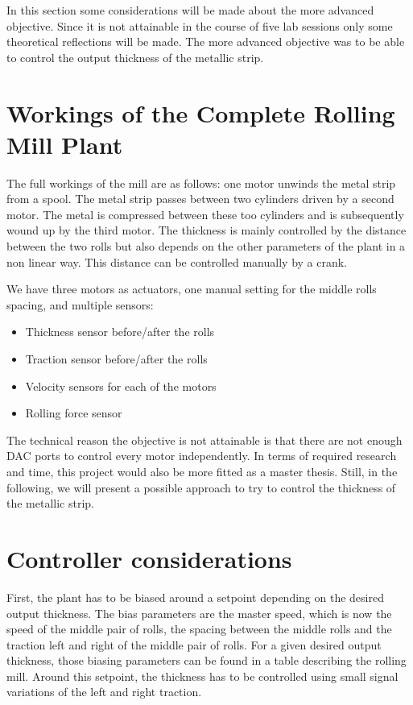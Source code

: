 In this section some considerations will be made about the more advanced objective. Since it is not attainable in the course of five lab sessions only some theoretical reflections will be made. The more advanced objective was to be able to control the output thickness of the metallic strip.

\section{Workings of the Complete Rolling Mill Plant}
The full workings of the mill are as follows: one motor unwinds the metal strip from a spool. The metal strip passes between two cylinders driven by a second motor. The metal is compressed between these too cylinders and is subsequently wound up by the third motor. The thickness is mainly controlled by the distance between the two rolls but also depends on the other parameters of the plant in a non linear way. This distance can be controlled manually by a crank.

We have three motors as actuators, one manual setting for the middle rolls spacing, and multiple sensors:
\begin{itemize}
\item Thickness sensor before/after the rolls
\item Traction sensor before/after the rolls
\item Velocity sensors for each of the motors
\item Rolling force sensor
\end{itemize}
The technical reason the objective is not attainable is that there are not enough DAC ports to control every motor independently. In terms of required research and time, this project would also be more fitted as a master thesis. Still, in the following, we will present a possible approach to try to control the thickness of the metallic strip.

\section{Controller considerations}
First, the plant has to be biased around a setpoint depending on the desired output thickness. The bias parameters are the master speed, which is now the speed of the middle pair of rolls, the spacing between the middle rolls and the traction left and right of the middle pair of rolls. For a given desired output thickness, those biasing parameters can be found in a table describing the rolling mill. Around this setpoint, the thickness has to be controlled using small signal variations of the left and right traction.


